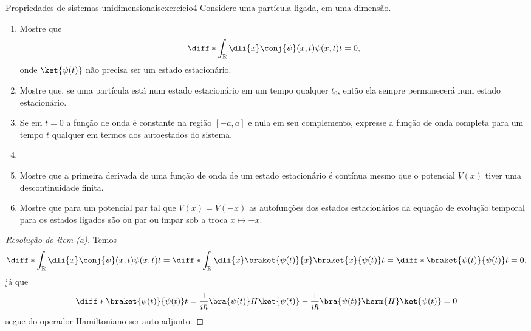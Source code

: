 \begin{exercício}{Propriedades de sistemas unidimensionais}{exercício4}
    Considere uma partícula ligada, em uma dimensão.
    \begin{enumerate}[label=(\alph*)]
        \item Mostre que
            \begin{equation*}
                \diff*{\int_{\mathbb{R}}\dli{x}\conj{\psi}(x,t)\psi(x,t)}{t} = 0,
            \end{equation*}
            onde \(\ket{\psi(t)}\) não precisa ser um estado estacionário.
        \item Mostre que, se uma partícula está num estado estacionário em um tempo qualquer \(t_0\), então ela sempre permanecerá num estado estacionário.
        \item Se em \(t = 0\) a função de onda é constante na região \([-a,a]\) e nula em seu complemento, expresse a função de onda completa para um tempo \(t\) qualquer em termos dos autoestados do sistema.
        \item {}
        \item Mostre que a primeira derivada de uma função de onda de um estado estacionário é contínua mesmo que o potencial \(V(x)\) tiver uma descontinuidade finita.
        \item Mostre que para um potencial par tal que \(V(x) = V(-x)\) as autofunções dos estados estacionários da equação de evolução temporal para os estados ligados são ou par ou ímpar sob a troca \(x \mapsto -x\).
\end{enumerate}
\end{exercício}
\begin{proof}[Resolução do item (a)]
    Temos
    \begin{equation*}
        \diff*{\int_{\mathbb{R}}\dli{x}\conj{\psi}(x,t)\psi(x,t)}{t} = \diff*{\int_{\mathbb{R}}\dli{x} \braket{\psi(t)}{x} \braket{x}{\psi(t)}}{t} = \diff*{\braket{\psi(t)}{\psi(t)}}{t} = 0,
    \end{equation*}
    já que
    \begin{equation*}
        \diff*{\braket{\psi(t)}{\psi(t)}}{t} = \frac{1}{i\hbar}\bra{\psi(t)}H\ket{\psi(t)} - \frac{1}{i\hbar}\bra{\psi(t)}\herm{H}\ket{\psi(t)} = 0
    \end{equation*}
    segue do operador Hamiltoniano ser auto-adjunto.
\end{proof}


